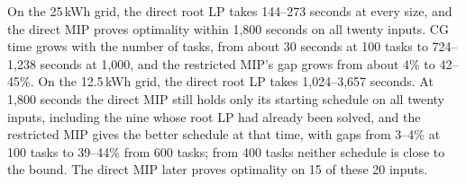 On the 25\,kWh grid, the direct root LP takes 144--273 seconds at every size, and the direct MIP proves optimality within 1{,}800 seconds on all twenty inputs.
CG time grows with the number of tasks, from about 30 seconds at 100 tasks to 724--1{,}238 seconds at 1{,}000, and the restricted MIP's gap grows from about 4\% to 42--45\%.
On the 12.5\,kWh grid, the direct root LP takes 1{,}024--3{,}657 seconds.
At 1{,}800 seconds the direct MIP still holds only its starting schedule on all twenty inputs, including the nine whose root LP had already been solved, and the restricted MIP gives the better schedule at that time, with gaps from 3--4\% at 100 tasks to 39--44\% from 600 tasks; from 400 tasks neither schedule is close to the bound.
The direct MIP later proves optimality on 15 of these 20 inputs.
